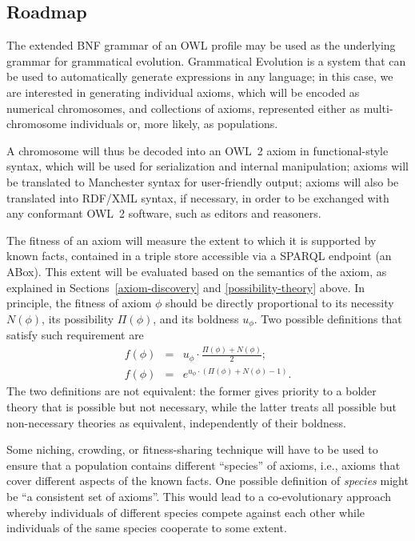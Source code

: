 \documentclass[a4paper]{article}
\newcounter{ex}
\begin{document}
\subsection{Roadmap}

The extended BNF grammar of an OWL profile may be used as the underlying grammar for grammatical evolution.
Grammatical Evolution is a system that can be used to automatically generate expressions
in any language; in this case, we are interested in generating individual axioms, which
will be encoded as numerical chromosomes, and collections of axioms, represented
either as multi-chromosome individuals or, more likely, as populations.

A chromosome will thus be decoded into an OWL~2 axiom in functional-style syntax,
which will be used for serialization and internal manipulation;
axioms will be translated to Manchester syntax for user-friendly output;
axioms will also be translated into RDF/XML syntax, if necessary, in order to be exchanged
with any conformant OWL~2 software, such as editors and reasoners.

The fitness of an axiom will measure the extent to which it is supported
by known facts, contained in a triple store accessible via a SPARQL endpoint
(an ABox). This extent will be evaluated based on the semantics of the axiom,
as explained in Sections~\ref{axiom-discovery} and \ref{possibility-theory} above.
In principle, the fitness of axiom $\phi$ should be directly proportional to
its necessity $N(\phi)$, its possibility $\Pi(\phi)$, and its boldness $u_\phi$.
Two possible definitions that satisfy such requirement are
\begin{eqnarray}
  f(\phi) &=& u_\phi \cdot \frac{\Pi(\phi) + N(\phi)}2; \\
  f(\phi) &=& e^{u_\phi \cdot (\Pi(\phi) + N(\phi) - 1)}.
\end{eqnarray}
The two definitions are not equivalent: the former gives priority to a bolder
theory that is possible but not necessary, while the latter treats all possible
but non-necessary theories as equivalent, independently of their boldness.

Some niching, crowding, or fitness-sharing technique will have to be used
to ensure that a population contains different ``species'' of axioms,
i.e., axioms that cover different aspects of the known facts.
One possible definition of \emph{species} might be ``a consistent set of axioms''.
This would lead to a co-evolutionary approach whereby individuals of different
species compete against each other while individuals of the same species
cooperate to some extent.
\end{document}
